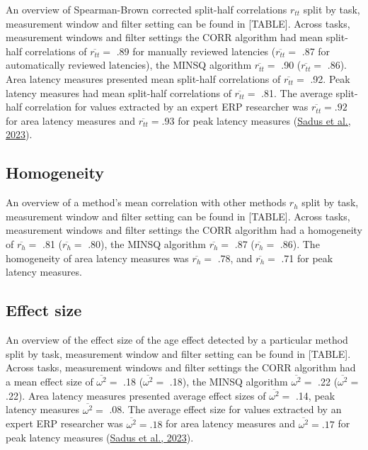 \documentclass[
  man]{apa7}
\begin{document}
An overview of Spearman-Brown corrected split-half correlations \(r_{tt}\) split by task, measurement window and filter setting can be found in {[}TABLE{]}. Across tasks, measurement windows and filter settings the CORR algorithm had mean split-half correlations of \(\overline{r_{tt}} =\) .89 for manually reviewed latencies (\(\overline{r_{tt}} =\) .87 for automatically reviewed latencies), the MINSQ algorithm \(\overline{r_{tt}} =\) .90 (\(\overline{r_{tt}} =\) .86). Area latency measures presented mean split-half correlations of \(\overline{r_{tt}} =\) .92. Peak latency measures had mean split-half correlations of \(\overline{r_{tt}} =\) .81. The average split-half correlation for values extracted by an expert ERP researcher was \(\overline{r_{tt}} = .92\) for area latency measures and \(\overline{r_{tt}} = .93\) for peak latency measures (\protect\hyperlink{ref-sadus2023multiverse}{Sadus et al., 2023}).

\hypertarget{homogeneity}{%
\subsection{Homogeneity}\label{homogeneity}}

An overview of a method's mean correlation with other methods \(r_h\) split by task, measurement window and filter setting can be found in {[}TABLE{]}. Across tasks, measurement windows and filter settings the CORR algorithm had a homogeneity of \(\overline{r_{h}} =\) .81 (\(\overline{r_{h}} =\) .80), the MINSQ algorithm \(\overline{r_{h}} =\) .87 (\(\overline{r_{h}} =\) .86). The homogeneity of area latency measures was \(\overline{r_{h}} =\) .78, and \(\overline{r_{h}} =\) .71 for peak latency measures.

\hypertarget{effect-size}{%
\subsection{Effect size}\label{effect-size}}

An overview of the effect size of the age effect detected by a particular method split by task, measurement window and filter setting can be found in {[}TABLE{]}. Across tasks, measurement windows and filter settings the CORR algorithm had a mean effect size of \(\overline{\omega^2} =\) .18 (\(\overline{\omega^2} =\) .18), the MINSQ algorithm \(\overline{\omega^2} =\) .22 (\(\overline{\omega^2} =\) .22). Area latency measures presented average effect sizes of \(\overline{\omega^2} =\) .14, peak latency measures \(\overline{\omega^2} =\) .08. The average effect size for values extracted by an expert ERP researcher was \(\overline{\omega^2} = .18\) for area latency measures and \(\overline{\omega^2} = .17\) for peak latency measures (\protect\hyperlink{ref-sadus2023multiverse}{Sadus et al., 2023}).
\end{document}
